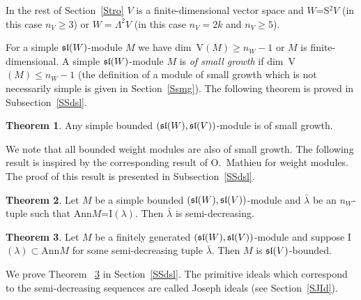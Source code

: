 \documentclass[12pt]{amsart}
\theoremstyle{definition}\newtheorem{theorem}{Theorem}[section]
\theoremstyle{definition}\newtheorem{definition}[proposition]{Definition}
\theoremstyle{remark}\newtheorem{example}[proposition]{Example}
\begin{document}
In the rest of Section~\ref{Stro} $V$ is a finite-dimensional vector space and $W$=S$^2V$ (in this case $n_V\ge 3$) or $W=\Lambda^2V$ (in this case $n_V=2k$ and $n_V\ge 5$).

For a simple $\frak{sl}(W)$-module $M$ we have dim~V$(M)\ge n_W-1$ or $M$ is finite-dimensional. A simple $\frak{sl}(W)$-module $M$ is {\it of small growth} if dim~V$(M)\le n_W-1$ (the definition of a module of small growth which is not necessarily simple is given in Section~\ref{Ssmg}). The following theorem is proved in Subsection~\ref{SSdsl}.
\begin{theorem}\label{Tsmsl}Any simple bounded $(\frak{sl}(W), \frak{sl}(V))$-module is of small growth.\end{theorem}
We note that all bounded weight modules are also of small growth. The following result is inspired by the corresponding result of O.~Mathieu for weight modules. The proof of this result is presented in Subsection~\ref{SSdsl}.
\begin{theorem}\label{Tannsl} Let $M$ be a simple bounded $(\frak{sl}(W), \frak{sl}(V))$-module and $\bar\lambda$ be an $n_W$-tuple such that Ann$M$=I$(\lambda)$. Then $\bar\lambda$ is semi-decreasing.\end{theorem}
\begin{theorem}\label{Tasl}Let $M$ be a finitely generated $(\frak{sl}(W), \frak{sl}(V))$-module and suppose I$(\lambda)\subset$Ann$M$ for some semi-decreasing tuple $\bar\lambda$. Then $M$ is $\frak{sl}(V)$-bounded.\end{theorem}
We prove Theorem ~\ref{Tasl} in Section~\ref{SSdsl}. The primitive ideals which correspond to the semi-decreasing sequences are called Joseph ideals (see Section~\ref{SJId}).
\end{document}
